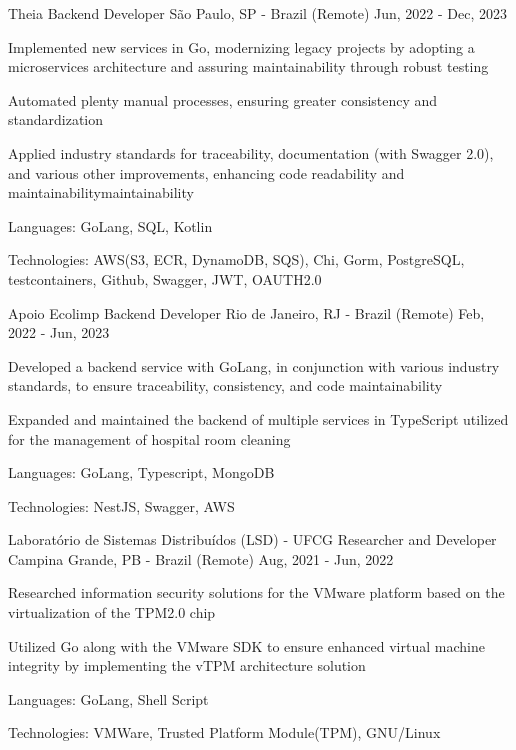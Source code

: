 
\begin{cventries}
  \cventry
  {Theia} %
  {Backend Developer} %
  {São Paulo, SP - Brazil (Remote)} %
  {Jun, 2022 - Dec, 2023} %
  {
    \begin{cvitems} %
      \item {Implemented new services in Go, modernizing legacy projects by adopting a microservices architecture and assuring maintainability through robust testing}
      \item {Automated plenty manual processes, ensuring greater consistency and standardization}
      \item {Applied industry standards for traceability, documentation (with Swagger 2.0), and various other improvements, enhancing code readability and maintainabilitymaintainability}
      \item {Languages: GoLang, SQL, Kotlin}
      \item {Technologies: AWS(S3, ECR, DynamoDB, SQS), Chi, Gorm, PostgreSQL, testcontainers, Github, Swagger, JWT, OAUTH2.0}
    \end{cvitems}
  }

  \cventry
  {Apoio Ecolimp} %
  {Backend Developer} %
  {Rio de Janeiro, RJ - Brazil (Remote)} %
  {Feb, 2022 - Jun, 2023} %
  {
    \begin{cvitems} %
      \item {Developed a backend service with GoLang, in conjunction with various industry standards, to ensure traceability, consistency, and code maintainability}
      \item {Expanded and maintained the backend of multiple services in TypeScript utilized for the management of hospital room cleaning}
      \item {Languages: GoLang, Typescript, MongoDB}
      \item {Technologies: NestJS, Swagger, AWS}
    \end{cvitems}
  }

  \cventry
  {Laboratório de Sistemas Distribuídos (LSD) - UFCG} %
  {Researcher and Developer} %
  {Campina Grande, PB - Brazil (Remote)} %
  {Aug, 2021 - Jun, 2022} %
  {
    \begin{cvitems} %
      \item {Researched information security solutions for the VMware platform based on the virtualization of the TPM2.0 chip}
      \item {Utilized Go along with the VMware SDK to ensure enhanced virtual machine integrity by implementing the vTPM architecture solution}
      \item {Languages: GoLang, Shell Script}
      \item {Technologies: VMWare, Trusted Platform Module(TPM), GNU/Linux}
    \end{cvitems}
  }


\end{cventries}
